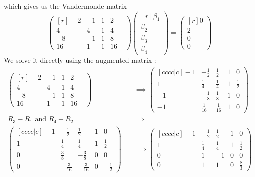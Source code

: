 which gives us the Vandermonde matrix 
\[
\begin{pmatrix*}[r]
    -2& -1& 1& 2&\\
    4& 4& 1& 4&\\
    -8& -1& 1& 8&\\
    16& 1& 1& 16&
\end{pmatrix*}
\begin{pmatrix*}[r]
    \beta_1 \\
     \beta_2\\
     \beta_3\\
     \beta_4
\end{pmatrix*}
= \begin{pmatrix*}[r]
     0 \\
     2 \\
     0 \\
     0
\end{pmatrix*}
\]
We solve it directly using the augmented matrix : 
\begin{align*}
\begin{pmatrix*}[r]
    -2& -1& 1& 2&\\[0.5em]
    4& 4& 1& 4&\\[0.5em]
    -8& -1& 1& 8&\\[0.5em]
    16& 1& 1& 16&
\end{pmatrix*}
     &\implies  
     \begin{pmatrix}[cccc|c]
         -1& - \frac{ 1 }{ 2 }& \frac{ 1 }{ 2 } & 1& 0\\[0.5em]
         1&  \frac{ 1 }{ 4 }& \frac{ 1 }{ 4 } & 1& \frac{ 1 }{ 2 } \\[0.5em]
         -1& - \frac{ 1 }{ 8 }& \frac{ 1 }{ 8 } & 1& 0\\[0.5em]
         -1&  \frac{ 1 }{ 16 }& \frac{ 1 }{ 16 } & 1& 0
\end{pmatrix} \\ 
         R_3 - R_1 \text{ and } R_4 - R_2  &\implies \\ 
         \begin{pmatrix}[cccc|c]
         -1& - \frac{ 1 }{ 2 }& \frac{ 1 }{ 2 } & 1& 0\\[0.5em]
         1&  \frac{ 1 }{ 4 }& \frac{ 1 }{ 4 } & 1& \frac{ 1 }{ 2 } \\[0.5em]
         0&  \frac{ 3 }{ 8 }& -\frac{ 3 }{ 8 } & 0& 0\\[0.5em]
         0&  -\frac{ 3 }{ 16 }& -\frac{ 3 }{ 16 } & 0& -\frac{ 1 }{ 2 } 
     \end{pmatrix} \quad &\implies 
\begin{pmatrix}[cccc|c]
         -1& - \frac{ 1 }{ 2 }& \frac{ 1 }{ 2 } & 1& 0\\[0.5em]
         1&  \frac{ 1 }{ 4 }& \frac{ 1 }{ 4 } & 1& \frac{ 1 }{ 2 } \\[0.5em]
         0&  1& - 1& 0& 0 \\[0.5em]
         0&  1&  1& 0& \frac{ 8 }{ 3 } 
     \end{pmatrix} 
\end{align*}
